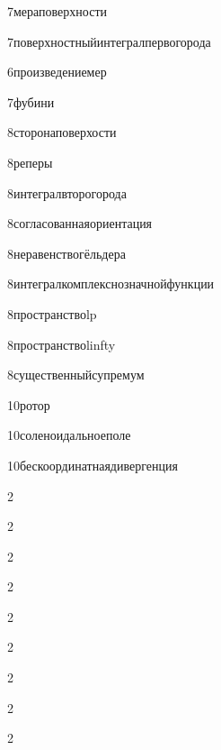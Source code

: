 {7}{мераповерхности}

{7}{поверхностныйинтегралпервогорода}

{6}{произведениемер}

{7}{фубини}

{8}{сторонаповерхости}

{8}{реперы}

{8}{интегралвторогорода}

{8}{согласованнаяориентация}

{8}{неравенствогёльдера}

{8}{интегралкомплекснозначнойфункции}

{8}{пространствоlp}

{8}{пространствоlinfty}

{8}{существенныйсупремум}

{10}{ротор}

{10}{соленоидальноеполе}

{10}{бескоординатнаядивергенция}

{2}{}

{2}{}

{2}{}

{2}{}

{2}{}

{2}{}

{2}{}

{2}{}

{2}{}

